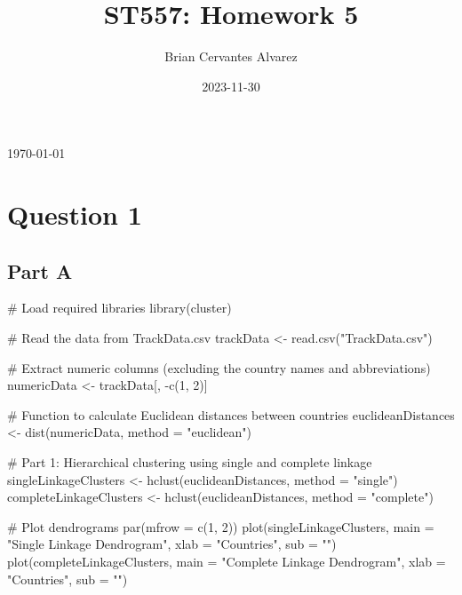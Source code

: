 \documentclass[
  letterpaper,
  DIV=11,
  numbers=noendperiod]{scrartcl}
\title{ST557: Homework 5}
\author{Brian Cervantes Alvarez}
\date{2023-11-30}
\makeatletter
\newenvironment{Shaded}{}{}
\newcommand{\AttributeTok}[1]{\textcolor[rgb]{0.84,0.60,0.13}{#1}}
\newcommand{\CommentTok}[1]{\textcolor[rgb]{0.57,0.51,0.45}{#1}}
\newcommand{\DecValTok}[1]{\textcolor[rgb]{0.96,0.45,0.00}{#1}}
\newcommand{\FunctionTok}[1]{\textcolor[rgb]{0.41,0.62,0.42}{#1}}
\newcommand{\NormalTok}[1]{\textcolor[rgb]{0.24,0.22,0.21}{#1}}
\newcommand{\OtherTok}[1]{\textcolor[rgb]{0.41,0.62,0.42}{#1}}
\newcommand{\SpecialCharTok}[1]{\textcolor[rgb]{0.69,0.38,0.53}{#1}}
\newcommand{\StringTok}[1]{\textcolor[rgb]{0.60,0.59,0.10}{#1}}
\renewcommand{\maketitle}{\bgroup\setlength{\parindent}{0pt}
\begin{flushleft}
  {\sffamily\huge\textbf{\MakeUppercase{\@title}}} \vspace{0.3cm} \newline
  {\Large {\@subtitle}} \newline
  {\large\@author} \newline
  {\large\today} %
\end{flushleft}\egroup
}
\makeatother
\begin{document}
\maketitle
\pagestyle{mystyle}

\ifdefined\Shaded\renewenvironment{Shaded}{\begin{tcolorbox}[interior hidden, boxrule=0pt, borderline west={3pt}{0pt}{shadecolor}, enhanced, sharp corners, breakable, frame hidden]}{\end{tcolorbox}}\fi

\hypertarget{question-1}{%
\section{Question 1}\label{question-1}}

\hypertarget{part-a}{%
\subsection{Part A}\label{part-a}}

\begin{Shaded}
\begin{Highlighting}[]
\CommentTok{\# Load required libraries}
\FunctionTok{library}\NormalTok{(cluster)}

\CommentTok{\# Read the data from TrackData.csv}
\NormalTok{trackData }\OtherTok{\textless{}{-}} \FunctionTok{read.csv}\NormalTok{(}\StringTok{"TrackData.csv"}\NormalTok{)}

\CommentTok{\# Extract numeric columns (excluding the country names and abbreviations)}
\NormalTok{numericData }\OtherTok{\textless{}{-}}\NormalTok{ trackData[, }\SpecialCharTok{{-}}\FunctionTok{c}\NormalTok{(}\DecValTok{1}\NormalTok{, }\DecValTok{2}\NormalTok{)]}

\CommentTok{\# Function to calculate Euclidean distances between countries}
\NormalTok{euclideanDistances }\OtherTok{\textless{}{-}} \FunctionTok{dist}\NormalTok{(numericData, }\AttributeTok{method =} \StringTok{"euclidean"}\NormalTok{)}

\CommentTok{\# Part 1: Hierarchical clustering using single and complete linkage}
\NormalTok{singleLinkageClusters }\OtherTok{\textless{}{-}} \FunctionTok{hclust}\NormalTok{(euclideanDistances, }\AttributeTok{method =} \StringTok{"single"}\NormalTok{)}
\NormalTok{completeLinkageClusters }\OtherTok{\textless{}{-}} \FunctionTok{hclust}\NormalTok{(euclideanDistances, }\AttributeTok{method =} \StringTok{"complete"}\NormalTok{)}

\CommentTok{\# Plot dendrograms}
\FunctionTok{par}\NormalTok{(}\AttributeTok{mfrow =} \FunctionTok{c}\NormalTok{(}\DecValTok{1}\NormalTok{, }\DecValTok{2}\NormalTok{))}
\FunctionTok{plot}\NormalTok{(singleLinkageClusters, }\AttributeTok{main =} \StringTok{"Single Linkage Dendrogram"}\NormalTok{, }\AttributeTok{xlab =} \StringTok{"Countries"}\NormalTok{, }\AttributeTok{sub =} \StringTok{""}\NormalTok{)}
\FunctionTok{plot}\NormalTok{(completeLinkageClusters, }\AttributeTok{main =} \StringTok{"Complete Linkage Dendrogram"}\NormalTok{, }\AttributeTok{xlab =} \StringTok{"Countries"}\NormalTok{, }\AttributeTok{sub =} \StringTok{""}\NormalTok{)}
\end{Highlighting}
\end{Shaded}
\end{document}
